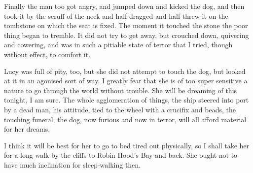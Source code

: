 Finally the man too got angry, and jumped down and kicked the dog, and then took it by the scruff of the neck and half dragged and half threw it on the tombstone on which the seat is fixed. The moment it touched the stone the poor thing began to tremble. It did not try to get away, but crouched down, quivering and cowering, and was in such a pitiable state of terror that I tried, though without effect, to comfort it. 

Lucy was full of pity, too, but she did not attempt to touch the dog, but looked at it in an agonised sort of way. I greatly fear that she is of too super sensitive a nature to go through the world without trouble. She will be dreaming of this tonight, I am sure. The whole agglomeration of things, the ship steered into port by a dead man, his attitude, tied to the wheel with a crucifix and beads, the touching funeral, the dog, now furious and now in terror, will all afford material for her dreams. 

I think it will be best for her to go to bed tired out physically, so I shall take her for a long walk by the cliffs to Robin Hood's Bay and back. She ought not to have much inclination for sleep-walking then. 
